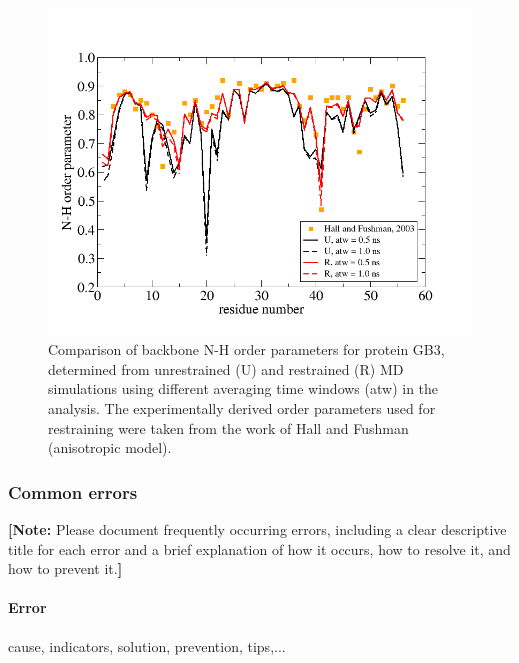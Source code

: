\begin{figure}[H]
\centering
\includegraphics[scale=.3]{../04_tutorial_01/figures/GB3_S2}
\caption{Comparison of backbone N-H order parameters for protein GB3, determined from unrestrained (U) and restrained (R) MD simulations using different averaging time windows (atw) in the analysis. The experimentally derived order parameters used for restraining were taken from the work of Hall and Fushman ~\cite{Hall_2003} (anisotropic model).}
\label{GB3_S2}
\end{figure}

\subsubsection{Common errors}
\textbf{[Note:} Please document frequently occurring errors, including a clear descriptive title for each error and a brief explanation of how it occurs, how to resolve it, and how to prevent it.\textbf{]}

\paragraph{Error}
cause, indicators, solution, prevention, tips,...



